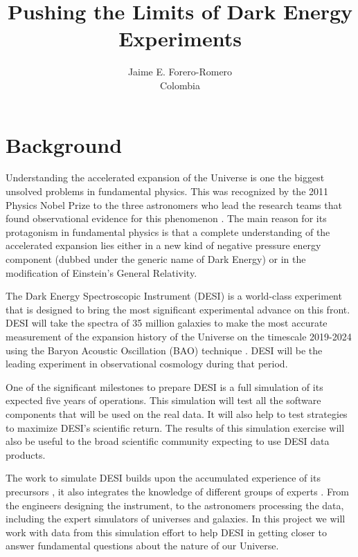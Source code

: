 \documentclass[12pt]{article}
\title{Pushing the Limits of Dark Energy Experiments}
\author{Jaime E. Forero-Romero\\Colombia}
\begin{document}
\maketitle
\pagestyle{empty}
\pagestyle{fancy}
\section*{Background}

Understanding the accelerated expansion of the Universe is one the
biggest unsolved problems in fundamental physics.  
This was recognized by the 2011 Physics Nobel Prize to the three
astronomers who lead the research teams that found observational evidence for
this phenomenon \cite{1998AJ....116.1009R,1999ApJ...517..565P}.  
The main reason for its protagonism in fundamental physics is that a
complete understanding of the accelerated expansion lies either in a
new kind of negative pressure energy component (dubbed under the
generic name of Dark Energy) or in the modification of Einstein's
General Relativity.   

The Dark Energy Spectroscopic Instrument (DESI) is a world-class
experiment that is designed to bring the most significant experimental
advance on this front. 
DESI will take the spectra of 35 million galaxies to make the most
accurate measurement of the expansion history of the Universe on the
timescale 2019-2024 using the Baryon Acoustic Oscillation (BAO) technique
\cite{2005ApJ...633..560E,2005MNRAS.362..505C}.    
DESI will be the leading experiment in observational cosmology during
that period.  

One of the significant milestones to prepare DESI is a full simulation
of its expected five years of operations. 
This simulation will test all the software components that will be used on
the real data. It will also help to test strategies to  maximize
DESI's scientific return.   
The results of this simulation exercise will also be useful to the
broad scientific community expecting to use DESI data products. 
 
The work to simulate DESI builds upon the accumulated experience of
its precursors \cite{2013AJ....145...10D}, it also integrates the knowledge of
different groups of experts \cite{2016A&C....15....1N}. From the
engineers designing  the instrument, to the astronomers processing the
data, including the expert simulators of universes and galaxies. 
In this project we will work with data from this simulation effort to
help DESI in getting closer to answer fundamental questions about
the nature of our Universe.  
\end{document}
